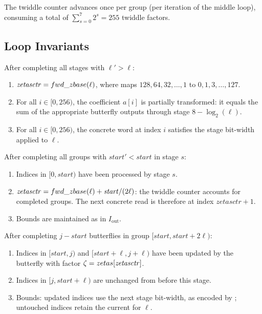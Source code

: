 The twiddle counter  advances once per group (per iteration of
the middle loop), consuming a total of $\sum_{s=0}^{7} 2^s = 255$ twiddle
factors.

\subsection{Loop Invariants}

\begin{definition}
  After completing all stages with $\ell' > \ell$:
  \begin{enumerate}
    \item $\mathit{zetasctr} = fwd\_zbase(\ell)$, where
           maps
          $128,64,32,\dots,1$ to $0,1,3,\dots,127$.
    \item For all $i \in [0, 256)$, the coefficient $a[i]$ is partially
          transformed: it equals the sum of the appropriate butterfly outputs
          through stage $8 - \log_2(\ell)$.
    \item For all $i \in [0, 256)$, the concrete word at index \(i\)
          satisfies the stage bit-width  applied to
          \(\ell\).
  \end{enumerate}
\label{def:outer_inv}
\end{definition}

\begin{definition}
  After completing all groups with $\mathit{start}' < \mathit{start}$ in stage $s$:
  \begin{enumerate}
    \item Indices in $[0, \mathit{start})$ have been processed by stage $s$.
    \item $\mathit{zetasctr} =
          fwd\_zbase(\ell) + \mathit{start}/(2\ell)$:
          the twiddle counter accounts for completed groups.  The next
          concrete read is therefore at index $\mathit{zetasctr}+1$.
    \item Bounds are maintained as in $I_{\text{out}}$.
  \end{enumerate}
\label{def:mid_inv}
\end{definition}

\begin{definition}
  After completing $j - \mathit{start}$ butterflies in group $[\mathit{start},
  \mathit{start}+2\ell)$:
  \begin{enumerate}
    \item Indices in $[\mathit{start}, j)$ and $[\mathit{start}+\ell, j+\ell)$
          have been updated by the butterfly with factor
          $\zeta = zetas[\mathit{zetasctr}]$.
    \item Indices in $[j, \mathit{start}+\ell)$ are unchanged from before
          this stage.
    \item Bounds: updated indices use the next stage bit-width, as encoded by
          ; untouched indices retain the current
           for \(\ell\).
  \end{enumerate}
\label{def:inner_inv}
\end{definition}

